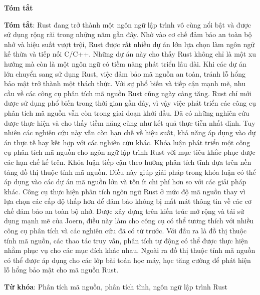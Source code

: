 \begin{center}
\textbf{\large{Tóm tắt}}
\end{center}


\begin{small}
\textbf{Tóm tắt}: Rust đang trở thành một ngôn ngữ lập trình vô cùng nổi bật và được sử dụng rộng rãi trong những năm gần đây.
Nhờ vào cơ chế đảm bảo an toàn bộ nhớ và hiệu suất vượt trội, Rust được rất nhiều dự án lớn lựa chọn làm ngôn ngữ kế thừa và tiếp nối C/C++.
Những dự án này cho thấy Rust không chỉ là một xu hướng mà còn là một ngôn ngữ có tiềm năng phát triển lâu dài.
Khi các dự án lớn chuyển sang sử dụng Rust, việc đảm bảo mã nguồn an toàn, tránh lỗ hổng bảo mật trở thành một thách thức.
Với sự phổ biến và tiếp cận mạnh mẽ, nhu cầu về các công cụ phân tích mã nguồn Rust cũng ngày càng tăng.
Rust chỉ mới được sử dụng phổ biến trong thời gian gần đây, vì vậy việc phát triển các công cụ phân tích mã nguồn vẫn còn trong giai đoạn khởi đầu.
Đã có những nghiên cứu được thực hiện và cho thấy tiềm năng cũng như kết quả thực tiễn nhất định.
Tuy nhiên các nghiên cứu này vẫn còn hạn chế về hiệu suất, khả năng áp dụng vào dự án thực tế hay kết hợp với các nghiên cứu khác.
Khóa luận phát triển một công cụ phân tích mã nguồn cho ngôn ngữ lập trình Rust với mục tiêu khắc phục được các hạn chế kế trên.
Khóa luận tiếp cận theo hướng phân tích tĩnh dựa trên nền tảng đồ thị thuộc tính mã nguồn.
Điều này giúp giải pháp trong khóa luận có thể áp dụng vào các dự án mã nguồn lớn và tốn ít chi phí hơn so với các giải pháp khác.
Công cụ thực hiện phân tích ngôn ngữ Rust ở mức độ mã nguồn thay vì lựa chọn các cấp độ thấp hơn để đảm bảo không bị mất mát thông tin về các cơ chế đảm bảo an toàn bộ nhớ.
Được xây dựng trên kiến trúc mở rộng và tái sử dụng mạnh mẽ của Joern, điều này làm cho công cụ có thể tương thích với nhiều công cụ phân tích và các nghiên cứu đã có từ trước.
Với đầu ra là đồ thị thuộc tính mã nguồn, các thao tác truy vấn, phân tích tự động có thể được thực hiện nhằm phục vụ cho các mục đích khác nhau.
Ngoài ra đồ thị thuộc tính mã nguồn có thể được áp dụng cho các lớp bài toán học máy, học tăng cường để phát hiện lỗ hổng bảo mật cho mã nguồn Rust.

\vspace*{1cm}
\textbf{Từ khóa}: Phân tích mã nguồn, phân tích tĩnh, ngôn ngữ lập trình Rust

\end{small}